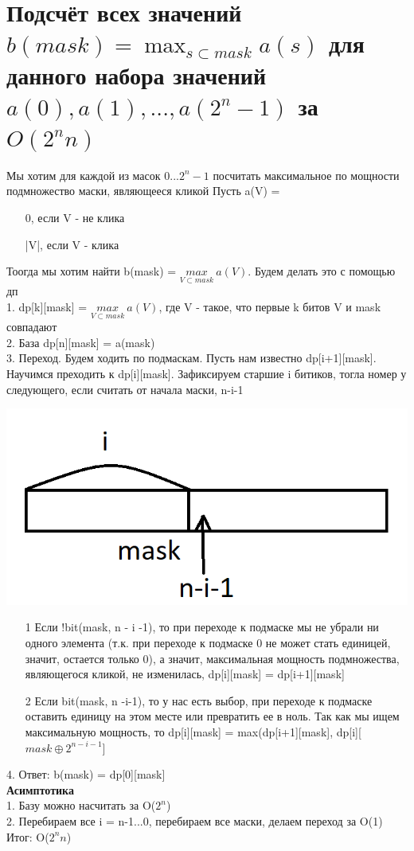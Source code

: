 \section{Подсчёт всех значений \texorpdfstring{$b(mask) = \max_{s \subset mask} a(s)$}{b(mask)} для данного набора значений $a(0), a(1), ..., a(2^n-1)$ за $O(2^nn)$}
 Мы хотим для каждой из масок 0...$2^n - 1$ посчитать максимальное по мощности подмножество маски, являющееся кликой
 Пусть a(V) = 
 \begin{itemize}
     \item [] 0, если V - не клика
     \item[]|V|, если V - клика
 \end{itemize}
 Тоогда мы хотим найти   b(mask) = $\underset{V \subset mask}{max} \ a(V)$. Будем делать это с помощью дп\\
 1. dp[k][mask] = $\underset{V \subset mask}{max} \ a(V)$, где V - такое, что первые k битов V и mask совпадают \\
 2. База dp[n][mask] = a(mask)\\
 3. Переход. Будем ходить по подмаскам. Пусть нам известно dp[i+1][mask]. Научимся преходить к dp[i][mask]. Зафиксируем старшие i битиков, тогла номер у следующего, если считать от начала маски, n-i-1 
 \begin{center}
     \includegraphics[width=17cm]{images/18-24_alg4.PNG}
 \end{center}
 \begin{itemize}
     \item [1]  Если !bit(mask, n - i -1), то при переходе к подмаске мы не убрали ни одного элемента (т.к. при переходе к подмаске 0 не может стать единицей, значит, остается только 0), а значит, максимальная мощность подмножества, являющегося кликой, не изменилась, dp[i][mask] = dp[i+1][mask]
     \item [2]  Если bit(mask, n -i-1), то у нас есть выбор, при переходе к подмаске оставить единицу на этом месте или превратить ее в ноль. Так как мы ищем максимальную мощность, то dp[i][mask] = max(dp[i+1][mask], dp[i][$mask \oplus 2^{n - i- 1}$]
 \end{itemize}
 4. Ответ: b(mask) = dp[0][mask]\\
 \textbf{Асимптотика}\\ 
 1. Базу можно насчитать за O($2^n$)\\
 2. Перебираем все i = n-1...0, перебираем все маски, делаем переход за O(1)
 \\
 Итог: O($2^n n$)
 
